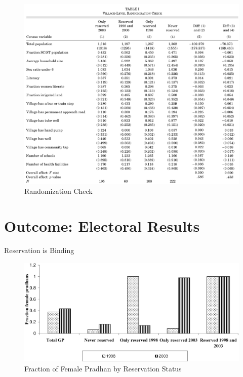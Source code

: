 \documentclass[
  10pt,
  ignorenonframetext,
  aspectratio=43,
]{beamer}
\begin{document}
\begin{frame}
\begin{figure}
\centering
\includegraphics{20220523-qje-beaman-duflo-powerful-women.assets/table1-randomization-check.png}
\caption{Randomization Check}
\end{figure}
\end{frame}

\hypertarget{outcome-electoral-results}{%
\section{Outcome: Electoral Results}\label{outcome-electoral-results}}

\begin{frame}{Reservation is Binding}
\protect\hypertarget{reservation-is-binding}{}
\begin{figure}
\centering
\includegraphics{20220523-qje-beaman-duflo-powerful-women.assets/figure1-binding policy effect.png}
\caption{Fraction of Female Pradhan by Reservation Status}
\end{figure}
\end{frame}
\end{document}

